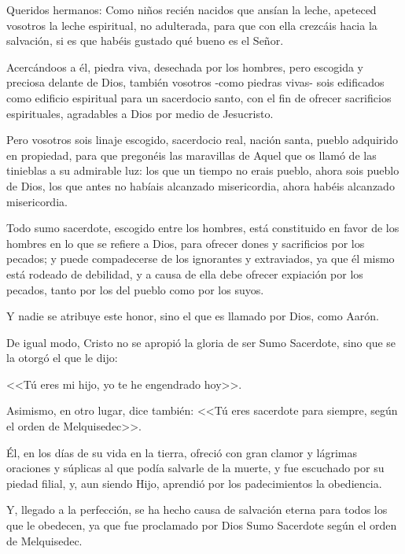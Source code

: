  Queridos hermanos: Como niños recién 
nacidos que ansían la leche, apeteced vosotros 
la leche espiritual, no adulterada, para que con 
ella crezcáis hacia la salvación, si es que habéis 
gustado qué bueno es el Señor.  

Acercándoos a 
él, piedra viva, desechada por los hombres, 
pero escogida y preciosa delante de Dios, 
también vosotros -como piedras vivas- sois 
edificados como edificio espiritual para un 
sacerdocio santo, con el fin de ofrecer 
sacrificios espirituales, agradables a Dios por 
medio de Jesucristo.  

Pero vosotros sois linaje 
escogido, sacerdocio real, nación santa, pueblo 
adquirido en propiedad, para que pregonéis 
las maravillas de Aquel que os llamó de las 
tinieblas a su admirable luz: los que un tiempo 
no erais pueblo, ahora sois pueblo de Dios, los 
que antes no habíais alcanzado misericordia, 
ahora habéis alcanzado misericordia. 




 Todo sumo sacerdote, escogido entre los 
hombres, está constituido en favor de los 
hombres en lo que se refiere a Dios, para 
ofrecer dones y sacrificios por los pecados; y 
puede compadecerse de los ignorantes y 
extraviados, ya que él mismo está rodeado de 
debilidad, y a causa de ella debe ofrecer 
expiación por los pecados, tanto por los del 
pueblo como por los suyos.  

Y nadie se 
atribuye este honor, sino el que es llamado por 
Dios, como Aarón.  

De igual modo, Cristo no se 
apropió la gloria de ser Sumo Sacerdote, sino 
que se la otorgó el que le dijo:  

<<Tú eres mi hijo, 
yo te he engendrado hoy>>.  

Asimismo, en otro 
lugar, dice también: <<Tú eres sacerdote para 
siempre, según el orden de Melquisedec>>.  

Él, 
en los días de su vida en la tierra, ofreció con 
gran clamor y lágrimas oraciones y súplicas al 
que podía salvarle de la muerte, y fue 
escuchado por su piedad filial, y, aun siendo 
Hijo, aprendió por los padecimientos la 
obediencia.  

Y, llegado a la perfección, se ha 
hecho causa de salvación eterna para todos los 
que le obedecen, ya que fue proclamado por 
Dios Sumo Sacerdote según el orden de 
Melquisedec. 



